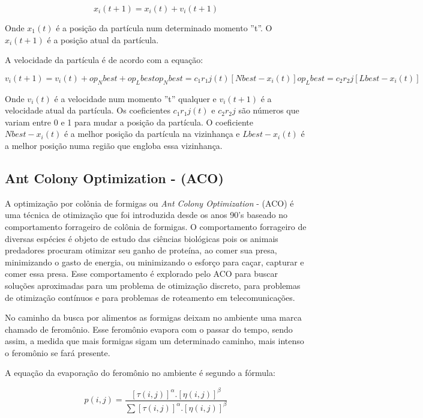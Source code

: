 \documentclass[conference,compsoc]{IEEEtran}
\begin{document}
\begin{equation}
x_i(t+1) = x_i(t) + v_i(t+1)
\end{equation}

Onde $x_1(t)$ é a posição da partícula num determinado momento ''t''. O $x_i(t+1) $ é a posição atual da partícula.

A velocidade da partícula é de acordo com a equação:

\begin{equation}
v_i(t+1) = v_i(t) + op_Nbest + op_Lbest 
op_Nbest = c_1r_1j(t)[Nbest - x_i(t)] 
op_Lbest = c_2r_2j[Lbest - x_i(t)]
\end{equation}

Onde $v_i(t)$ é a velocidade num momento ''t'' qualquer e $v_i(t+1)$ é a velocidade atual da partícula.
Os coeficientes $c_1r_1j(t)$ e $c_2r_2j$ são números que variam entre 0 e 1 para mudar a posição da partícula.
O coeficiente $Nbest - x_i(t)$ é a melhor posição da partícula na vizinhança e $Lbest - x_i(t)$ é a melhor posição
numa região que engloba essa vizinhança.

\subsection{Ant Colony Optimization - (ACO) }\label{arte:algo:aco}

A optimização por colônia de formigas ou \textit{Ant Colony Optimization} - (ACO) é uma técnica de otimização que foi
introduzida desde os anos 90's \cite{Blum2005} baseado no comportamento forrageiro de colônia de formigas.
O comportamento forrageiro de diversas espécies \cite{Dorigo2005} é objeto de estudo das ciências biológicas pois os animais predadores 
procuram otimizar seu ganho de proteína, ao comer sua presa, minimizando o gasto de energia, ou minimizando o esforço para
caçar, capturar e comer essa presa. Esse comportamento é explorado pelo ACO para buscar soluções aproximadas para um
problema de otimização discreto, para problemas de otimização contínuos e para problemas de roteamento em telecomunicações.

No caminho da busca por alimentos as formigas deixam no ambiente uma marca chamado de feromônio.
Esse feromônio evapora com o passar do tempo, sendo assim, a medida que mais formigas sigam um determinado caminho,
mais intenso o feromônio se fará presente. 

A equação da evaporação do feromônio no ambiente é segundo a fórmula:

\begin{equation}
p(i,j)= \frac{[\tau (i,j)]^{\alpha }.[\eta (i,j)]^{\beta}}{\sum [\tau (i,j)]^{\alpha }.[\eta (i,j)]^{\beta}}
\end{equation}
\end{document}
